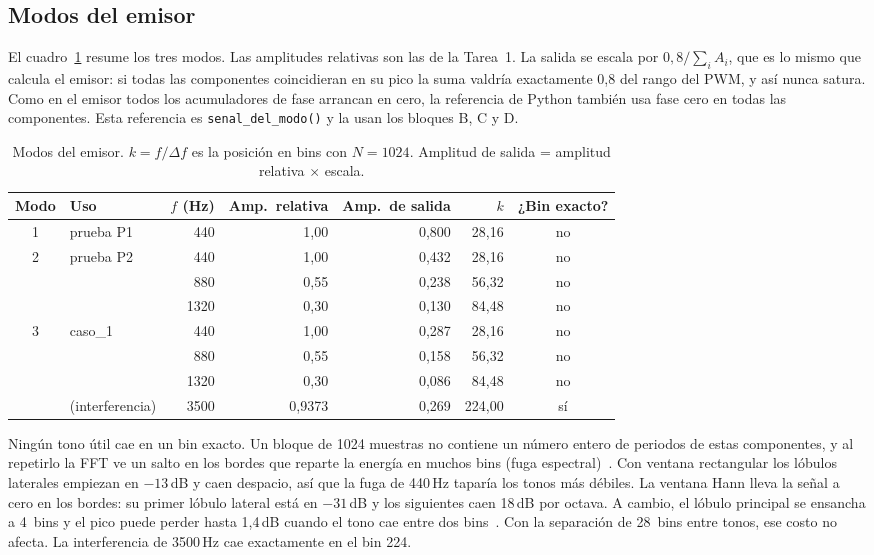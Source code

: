 \subsection{Modos del emisor}

El cuadro~\ref{tab:modos} resume los tres modos. Las amplitudes relativas son
las de la Tarea~1. La salida se escala por $0{,}8/\sum_i A_i$, que es lo mismo
que calcula el emisor: si todas las componentes coincidieran en su pico la suma
valdría exactamente 0,8 del rango del PWM, y así nunca satura. Como en el
emisor todos los acumuladores de fase arrancan en cero, la referencia de Python
también usa fase cero en todas las componentes. Esta referencia es
\texttt{senal\_del\_modo()} y la usan los bloques B, C y D.

\begin{table}[H]
\centering\small
\caption{Modos del emisor. $k = f/\Delta f$ es la posición en bins con
$N = 1024$. Amplitud de salida = amplitud relativa $\times$ escala.}
\label{tab:modos}
\begin{tabular}{clrrrrc}
\toprule
Modo & Uso & $f$ (Hz) & Amp.\ relativa & Amp.\ de salida & $k$ & ¿Bin exacto? \\
\midrule
1 & prueba P1        & 440  & 1,00   & 0,800 & 28,16  & no \\
\midrule
2 & prueba P2        & 440  & 1,00   & 0,432 & 28,16  & no \\
  &                  & 880  & 0,55   & 0,238 & 56,32  & no \\
  &                  & 1320 & 0,30   & 0,130 & 84,48  & no \\
\midrule
3 & caso\_1          & 440  & 1,00   & 0,287 & 28,16  & no \\
  &                  & 880  & 0,55   & 0,158 & 56,32  & no \\
  &                  & 1320 & 0,30   & 0,086 & 84,48  & no \\
  & (interferencia)  & 3500 & 0,9373 & 0,269 & 224,00 & sí \\
\bottomrule
\end{tabular}
\end{table}

Ningún tono útil cae en un bin exacto. Un bloque de 1024 muestras no contiene un
número entero de periodos de estas componentes, y al repetirlo la FFT ve un
salto en los bordes que reparte la energía en muchos bins (fuga espectral)~\cite{harris1978}. Con
ventana rectangular los lóbulos laterales empiezan en $-13$\,dB y caen
despacio, así que la fuga de 440\,Hz taparía los tonos más débiles. La ventana
Hann lleva la señal a cero en los bordes: su primer lóbulo lateral está en
$-31$\,dB y los siguientes caen 18\,dB por octava. A cambio, el lóbulo principal
se ensancha a 4~bins y el pico puede perder hasta 1,4\,dB cuando el tono cae
entre dos bins~\cite{harris1978}. Con la separación de 28~bins entre tonos, ese costo no afecta.
La interferencia de 3500\,Hz cae exactamente en el bin 224.

